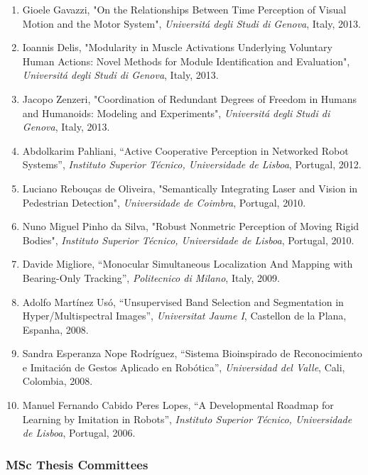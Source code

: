 \begin{enumerate}
\item
  Gioele Gavazzi, "On the Relationships Between Time Perception of
  Visual Motion and the Motor System", \emph{Universitá degli Studi di
  Genova}, Italy, 2013.
\item
  Ioannis Delis, "Modularity in Muscle Activations Underlying Voluntary
  Human Actions: Novel Methods for Module Identification and
  Evaluation", \emph{Universitá degli Studi di Genova}, Italy, 2013.
\item
  Jacopo Zenzeri, "Coordination of Redundant Degrees of Freedom in
  Humans and Humanoids: Modeling and Experiments", \emph{Universitá
  degli Studi di} \emph{Genova}, Italy, 2013.
\item
  Abdolkarim Pahliani, ``Active Cooperative Perception in Networked
  Robot Systems'', \emph{Instituto Superior Técnico, Universidade de
  Lisboa}, Portugal, 2012.
\item
  Luciano Rebouças de Oliveira, "Semantically Integrating Laser and
  Vision in Pedestrian Detection", \emph{Universidade de Coimbra},
  Portugal, 2010.
\item
  Nuno Miguel Pinho da Silva, "Robust Nonmetric Perception of Moving
  Rigid Bodies", \emph{Instituto Superior Técnico, Universidade de
  Lisboa}, Portugal, 2010.
\item
  Davide Migliore, ``Monocular Simultaneous Localization And Mapping
  with Bearing-Only Tracking'', \emph{Politecnico di Milano}, Italy,
  2009.
\item
  Adolfo Martínez Usó, ``Unsupervised Band Selection and Segmentation in
  Hyper/Multispectral Images'', \emph{Universitat Jaume I}, Castellon de
  la Plana, Espanha, 2008.
\item
  Sandra Esperanza Nope Rodríguez, ``Sistema Bioinspirado de
  Reconocimiento e Imitación de Gestos Aplicado en Robótica'',
  \emph{Universidad del Valle}, Cali, Colombia, 2008.~
\item
  Manuel Fernando Cabido Peres Lopes, ``A Developmental Roadmap for
  Learning by Imitation in Robots'', \emph{Instituto Superior Técnico,
  Universidade de Lisboa}, Portugal, 2006.
\end{enumerate}

\subsubsection{MSc Thesis Committees}\label{msc-thesis-committees}

